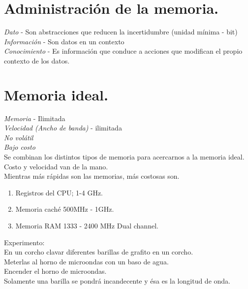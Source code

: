 \newpage
\chapter{Administraci\'{o}n de la memoria.}

\textit{Dato} - Son abstracciones que reducen la incertidumbre (unidad m\'{i}nima - bit)\\
\textit{Informaci\'{o}n} - Son datos en un contexto\\
\textit{Conocimiento} - Es informaci\'{o}n que conduce a acciones que modifican el propio contexto de los datos.\\

\chapter{Memoria ideal.}

\textit{Memoria} - Ilimitada\\
\textit{Velocidad (Ancho de banda)} - ilimitada\\
\textit{No vol\'{a}til}\\
\textit{Bajo costo}\\
Se combinan los distintos tipos de memoria para acercarnos a la memoria ideal.\\

Costo y velocidad van de la mano.\\

Mientras m\'{a}s r\'{a}pidas son las memorias, m\'{a}s costosas son.

\begin{enumerate}
	\item Registros del CPU; 1-4 GHz.
	\item Memoria cach\'{e} 500MHz - 1GHz.
	\item Memoria RAM 1333 - 2400 MHz Dual channel.
\end{enumerate}
Experimento:\\
En un corcho clavar diferentes barillas de grafito en un corcho.\\
Meterlas al horno de microondas con un baso de agua.\\
Encender el horno de microondas.\\
Solamente una barilla se pondr\'{a} incandecente y \'{e}sa es la longitud de onda.\\


